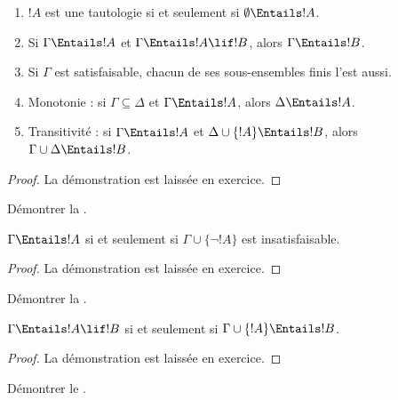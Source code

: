 \documentclass[../../../include/open-logic-section]{subfiles}
\begin{document}
\begin{prop}
\begin{enumerate}
\item $!A$ est une tautologie si et seulement si
  $\emptyset \Entails !A$.
\item Si $\Gamma \Entails !A$ et $\Gamma \Entails !A \lif !B$,
  alors $\Gamma \Entails !B$.
\item Si $\Gamma$ est satisfaisable, chacun de ses sous-ensembles
  finis l'est aussi.
\item {} Monotonie : si
  $\Gamma \subseteq \Delta$ et $\Gamma \Entails !A$, alors
  $\Delta \Entails !A$.
\item {} Transitivité : si $\Gamma \Entails !A$ et
  $\Delta \cup \{!A\} \Entails !B$, alors
  $\Gamma \cup \Delta \Entails !B$.
\end{enumerate}
\end{prop}

\begin{proof}
La démonstration est laissée en exercice.
\end{proof}

\begin{prob}
Démontrer la .
\end{prob}

\begin{prop}
  $\Gamma \Entails !A$ si et seulement si
  $\Gamma \cup \{\lnot !A\}$ est insatisfaisable.
\end{prop}

\begin{proof}
La démonstration est laissée en exercice.
\end{proof}

\begin{prob}
Démontrer la .
\end{prob}

\begin{thm}
  $\Gamma \Entails !A \lif !B$ si et seulement si
  $\Gamma \cup \{!A\} \Entails !B$.
\end{thm}

\begin{proof}
La démonstration est laissée en exercice.
\end{proof}

\begin{prob}
Démontrer le .
\end{prob}
\end{document}
